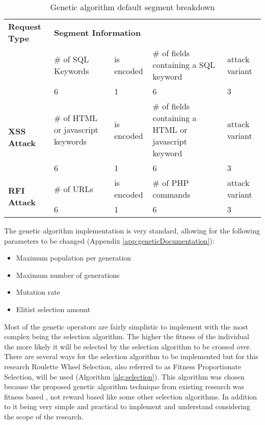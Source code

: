 \begin{table}
	\begin{tabular}{|p{1.25in}|p{1in}|p{1in}|p{1in}|p{1in}|}
	\hline
	\multicolumn{1}{|p{1.25in}|}{\textbf{Request Type}} & \multicolumn{4}{p{4in}|}{\textbf{Segment Information}} \\ \hhline{|=|=|=|=|=|}
	\multirow{2}{*}{\textbf{SQL Injection}}            & \# of SQL Keywords & is encoded & \# of fields containing a SQL keyword & attack variant \\ \cline{2-5}
		                                      & 6             & 1          & 6            & 3 \\ \hline
	\multirow{2}{*}{\textbf{XSS Attack}}               & \# of HTML or javascript keywords & is encoded & \# of fields containing a HTML or javascript keyword & attack variant \\ \cline{2-5}
		                                      & 6             & 1          & 6            & 3 \\ \hline
	\multirow{2}{*}{\textbf{RFI Attack}}               & \# of URLs & is encoded & \# of PHP commands & attack variant \\ \cline{2-5}
		                                      & 6             & 1          & 6            & 3 \\ \hline
	\end{tabular}
	\caption{Genetic algorithm default segment breakdown}
	\label{tab:geneticSegments}
\end{table}

The genetic algorithm implementation is very standard, allowing for the following parameters to be changed (Appendix \ref{app:geneticDocumentation}):

\begin{itemize}
	\item Maximum population per generation
	\item Maximum number of generations
	\item Mutation rate
	\item Elitist selection amount
\end{itemize}

Most of the genetic operators are fairly simplistic to implement with the most complex being the selection algorithm.  The higher the fitness of the individual the more likely it will be selected by the selection algorithm to be crossed over.  There are several ways for the selection algorithm to be implemented but for this research Roulette Wheel Selection, also referred to as Fitness Proportionate Selection, will be used (Algorithm \ref{alg:selection}).  This algorithm was chosen because the proposed genetic algorithm technique from existing research was fitness based \cite{mainPaper}, not reward based like some other selection algorithms.  In addition to it being very simple and practical to implement and understand considering the scope of the research.

